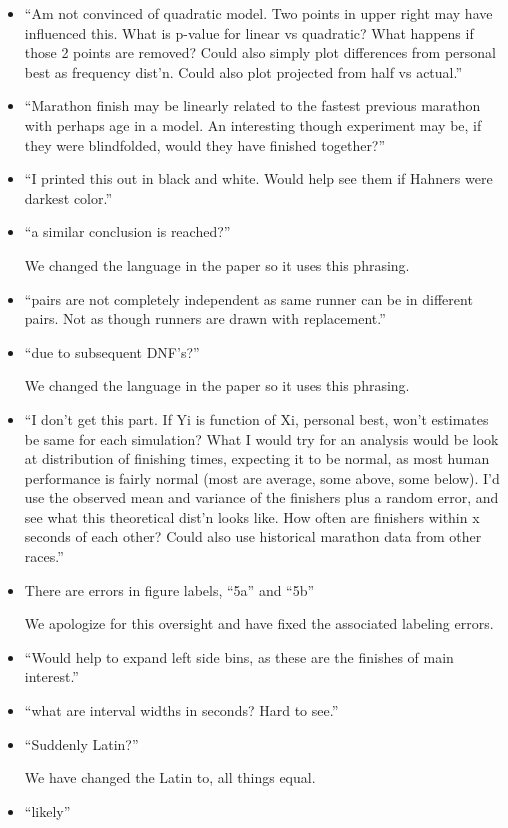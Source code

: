 \documentclass[12pt]{article}
\begin{document}
\begin{itemize}
\item ``Am not convinced of quadratic model. Two points in upper right
  may have influenced this. What is p-value for linear vs quadratic?
  What happens if those 2 points are removed? Could also simply plot
  differences from personal best as frequency dist'n. Could also plot
  projected from half vs actual.''

\item ``Marathon finish may be linearly related to the fastest
  previous marathon with perhaps age in a model. An interesting though
  experiment may be, if they were blindfolded, would they have
  finished together?''

\item ``I printed this out in black and white. Would help see them if
  Hahners were darkest color.''

\item ``a similar conclusion is reached?''

  We changed the language in the paper so it uses this phrasing.

\item ``pairs are not completely independent as same runner can be in
  different pairs. Not as though runners are drawn with replacement.''

\item ``due to subsequent DNF's?''

  We changed the language in the paper so it uses this phrasing.

\item ``I don't get this part. If Yi is function of Xi, personal best,
  won't estimates be same for each simulation?  What I would try for
  an analysis would be look at distribution of finishing times,
  expecting it to be normal, as most human performance is fairly
  normal (most are average, some above, some below). I'd use the
  observed mean and variance of the finishers plus a random error, and
  see what this theoretical dist'n looks like. How often are finishers
  within x seconds of each other? Could also use historical marathon
  data from other races.''

\item There are errors in figure labels, ``5a'' and ``5b''

  We apologize for this oversight and have fixed the associated
  labeling errors.

\item ``Would help to expand left side bins, as these are the finishes
  of main interest.''

\item ``what are interval widths in seconds? Hard to see.''

\item ``Suddenly Latin?''

  We have changed the Latin to, all things equal.

\item ``likely''


\end{itemize}

 
\end{document}
